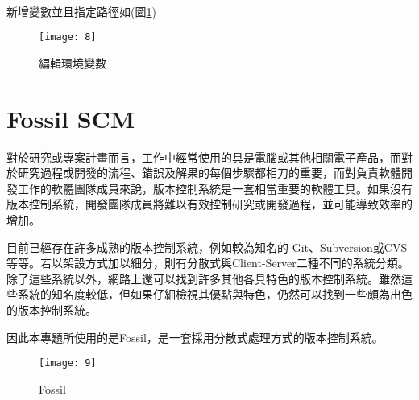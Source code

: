 \par
\\
\renewcommand{\baselinestretch}{1} %
\twelve \hspace{0.5em} 新增變數並且指定路徑如(圖\ref{fig.編輯環境變數})
\\
\par
\renewcommand{\baselinestretch}{1.7} %
\begin{figure}[hbt!]
\begin{center}
\texttt{[image: 8]}
\caption{\large 編輯環境變數}\label{fig.編輯環境變數}
\end{center}
\end{figure}
\par

\renewcommand{\baselinestretch}{20} %
\section{Fossil SCM}
\par
\renewcommand{\baselinestretch}{1} %
\twelve \qquad 對於研究或專案計畫而言，工作中經常使用的具是電腦或其他相關電子產品，而對於研究過程或開發的流程、錯誤及解果的每個步驟都相刀的重要，而對負責軟體開發工作的軟體團隊成員來說，版本控制系統是一套相當重要的軟體工具。如果沒有版本控制系統，開發團隊成員將難以有效控制研究或開發過程，並可能導致效率的增加。
\\
\par
\renewcommand{\baselinestretch}{1} %
\twelve \hspace{0.5em} 目前已經存在許多成熟的版本控制系統，例如較為知名的 Git、Subversion或CVS等等。若以架設方式加以細分，則有分散式與Client-Server二種不同的系統分類。除了這些系統以外，網路上還可以找到許多其他各具特色的版本控制系統。雖然這些系統的知名度較低，但如果仔細檢視其優點與特色，仍然可以找到一些頗為出色的版本控制系統。
\\
\par
\renewcommand{\baselinestretch}{1} %
\twelve \hspace{0.5em} 因此本專題所使用的是Fossil，是一套採用分散式處理方式的版本控制系統。
\\
\par
\renewcommand{\baselinestretch}{1.7} %
\begin{figure}[hbt!]
\begin{center}
\texttt{[image: 9]}
\caption{\large Fossil}\label{fig.Fossil}
\end{center}
\end{figure}
\par
\\
\renewcommand{\baselinestretch}{1} %


